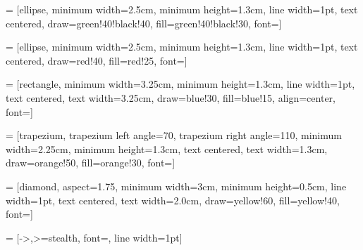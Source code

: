 \makeatother 











 = [ellipse,  minimum width=2.5cm, minimum height=1.3cm, line width=1pt, text centered, draw=green!40!black!40, fill=green!40!black!30, font=\tiny]

 = [ellipse,  minimum width=2.5cm, minimum height=1.3cm, line width=1pt, text centered, draw=red!40, fill=red!25, font=\tiny]

 = [rectangle, minimum width=3.25cm, minimum height=1.3cm, line width=1pt, text centered, text width=3.25cm, draw=blue!30, fill=blue!15, align=center, font=\tiny]


 = [trapezium, trapezium left angle=70, trapezium right angle=110, minimum width=2.25cm, minimum height=1.3cm, text centered, text width=1.3cm, draw=orange!50, fill=orange!30, font=\tiny]


 = [diamond, aspect=1.75, minimum width=3cm, minimum height=0.5cm, line width=1pt, text centered, text width=2.0cm, draw=yellow!60, fill=yellow!40, font=\tiny]

 = [->,>=stealth, font=\tiny, line width=1pt]


    